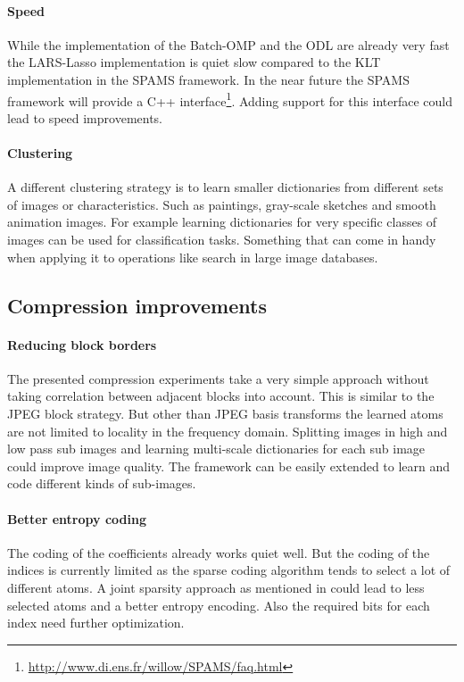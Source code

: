 \paragraph{Speed}
While the implementation of the Batch-OMP and the ODL are already very fast
the LARS-Lasso implementation is quiet slow compared to the KLT implementation
in the SPAMS framework. In the near future the SPAMS framework will provide a
C++ interface\footnote{\url{http://www.di.ens.fr/willow/SPAMS/faq.html}}. Adding
support for this interface could lead to speed improvements. 

\paragraph{Clustering}
A different clustering strategy is to learn smaller dictionaries from different
sets of images or characteristics. Such as paintings, gray-scale sketches and
smooth animation images. For example learning dictionaries for very specific
classes of images can be used for classification tasks. Something that can come
in handy when applying it to operations like search in large image databases.


\subsection{Compression improvements}
\paragraph{Reducing block borders} The presented compression experiments
take a very simple approach without taking correlation between adjacent
blocks into account. This is similar to the JPEG block strategy. But other than
JPEG basis transforms the learned atoms are not limited to locality in
the frequency domain. Splitting images in high and low pass sub images and
learning multi-scale dictionaries for each sub image could improve image
quality. The framework can be easily extended to learn and code different kinds
of sub-images.

\paragraph{Better entropy coding}
The coding of the coefficients already works quiet well. But the coding of the
indices is currently limited as the sparse coding algorithm tends to select a
lot of different atoms. A joint sparsity approach as mentioned in
 could lead to less selected atoms and a better
entropy encoding. Also the required bits for each index need further
optimization.









